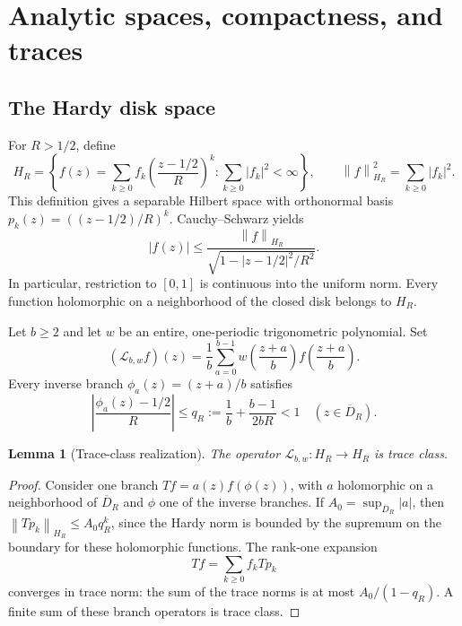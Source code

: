 \documentclass[11pt,a4paper]{article}
\newtheorem{lemma}[theorem]{Lemma}
\theoremstyle{definition}
\theoremstyle{remark}
\newcommand{\Lop}{\mathcal L}
\newcommand{\abs}[1]{\left|#1\right|}
\newcommand{\norm}[1]{\left\|#1\right\|}
\numberwithin{equation}{section}
\begin{document}
\section{Analytic spaces, compactness, and traces}
\label{sec:analytic}

\subsection{The Hardy disk space}
For $R>1/2$, define
\begin{equation}
 H_R=\left\{f(z)=\sum_{k\ge0}f_k
       \left(\frac{z-1/2}{R}\right)^k:
       \sum_{k\ge0}|f_k|^2<\infty\right\},\qquad
 \norm f_{H_R}^2=\sum_{k\ge0}|f_k|^2.
 \label{eq:Hardy}
\end{equation}
This definition gives a separable Hilbert space with orthonormal basis
$p_k(z)=((z-1/2)/R)^k$. Cauchy--Schwarz yields
\begin{equation}
 |f(z)|\le\frac{\norm f_{H_R}}
 {\sqrt{1-|z-1/2|^2/R^2}}.
 \label{eq:evaluation}
\end{equation}
In particular, restriction to $[0,1]$ is continuous into the uniform norm.
Every function holomorphic on a neighborhood of the closed disk belongs to
$H_R$.

Let $b\ge2$ and let $w$ be an entire, one-periodic trigonometric polynomial.
Set
\begin{equation}
 (\Lop_{b,w}f)(z)=\frac1b\sum_{a=0}^{b-1}
       w\!\left(\frac{z+a}{b}\right)
       f\!\left(\frac{z+a}{b}\right).
 \label{eq:generalL}
\end{equation}
Every inverse branch $\phi_a(z)=(z+a)/b$ satisfies
\begin{equation}
 \abs{\frac{\phi_a(z)-1/2}{R}}
 \le q_R:=\frac1b+\frac{b-1}{2bR}<1
 \quad(z\in\overline D_R).
 \label{eq:branchcontraction}
\end{equation}

\begin{lemma}[Trace-class realization]
\label{lem:traceclass}
The operator $\Lop_{b,w}:H_R\to H_R$ is trace class.
\end{lemma}
\begin{proof}
Consider one branch $Tf=a(z)f(\phi(z))$, with $a$ holomorphic on a
neighborhood of $\overline D_R$ and $\phi$ one of the inverse branches.
If $A_0=\sup_{\overline D_R}|a|$, then
$\norm{Tp_k}_{H_R}\le A_0q_R^k$, since the Hardy norm is bounded by the
supremum on the boundary for these holomorphic functions. The rank-one
expansion
\[
 Tf=\sum_{k\ge0}f_kTp_k
\]
converges in trace norm: the sum of the trace norms is at most
$A_0/(1-q_R)$. A finite sum of these branch operators is trace class.
\end{proof}
\end{document}
